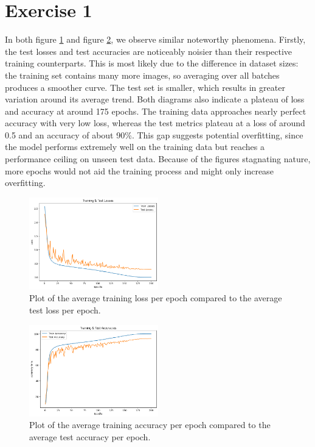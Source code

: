 

\section{Exercise 1}
In both figure \ref{figure_1} and figure \ref{figure_2}, we observe similar noteworthy phenomena. Firstly, the test losses and test accuracies are noticeably noisier than their respective training counterparts. This is most likely due to the difference in dataset sizes: the training set contains many more images, so averaging over all batches produces a smoother curve. The test set is smaller, which results in greater variation around its average trend.
Both diagrams also indicate a plateau of loss and accuracy at around 175 epochs. The training data approaches nearly perfect accuracy with very low loss, whereas the test metrics plateau at a loss of around 0.5 and an accuracy of about 90\%. This gap suggests potential overfitting, since the model performs extremely well on the training data but reaches a performance ceiling on unseen test data. Because of the figures stagnating nature, more epochs would not aid the training process and might only increase overfitting. 


\begin{figure}[htbp] 
    \centering
    \includegraphics[width=0.5\textwidth]{images/ex_1_loss} 
    \caption{Plot of the average training loss per epoch compared to the average test loss per epoch.}
    \label{figure_1}
\end{figure}

\begin{figure}[htbp] 
   \centering
   \includegraphics[width=0.5\textwidth]{images/ex_1_acc} 
   \caption{Plot of the average training accuracy per epoch compared to the average test accuracy per epoch.}
   \label{figure_2}

\end{figure}











